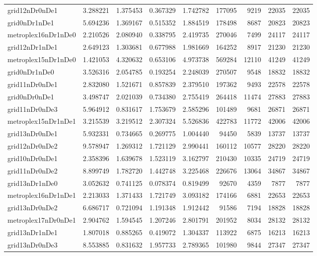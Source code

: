 \begin{longtable}{|l|r|r|r|r|r|r|r|r|}
grid12nDr0nDe1 & 3.288221 & 1.375453 & 0.367329 & 1.742782 & 177095 & 9219 & 22035 & 22035 \\
grid0nDr1nDe1 & 5.694236 & 1.369167 & 0.515352 & 1.884519 & 178498 & 8687 & 20823 & 20823 \\
metroplex16nDr1nDe0 & 2.210526 & 2.080940 & 0.338795 & 2.419735 & 270046 & 7499 & 24117 & 24117 \\
grid12nDr1nDe1 & 2.649123 & 1.303681 & 0.677988 & 1.981669 & 164252 & 8917 & 21230 & 21230 \\
metroplex15nDr1nDe0 & 1.421053 & 4.320632 & 0.653106 & 4.973738 & 569284 & 12110 & 41249 & 41249 \\
grid0nDr1nDe0 & 3.526316 & 2.054785 & 0.193254 & 2.248039 & 270507 & 9548 & 18832 & 18832 \\
grid11nDr0nDe1 & 2.832080 & 1.521671 & 0.857839 & 2.379510 & 197362 & 9493 & 22578 & 22578 \\
grid0nDr0nDe1 & 3.498747 & 2.021039 & 0.734380 & 2.755419 & 264418 & 11474 & 27883 & 27883 \\
grid11nDr0nDe3 & 5.964912 & 0.831617 & 1.753679 & 2.585296 & 101489 & 9681 & 26871 & 26871 \\
metroplex15nDr1nDe1 & 3.215539 & 3.219512 & 2.307324 & 5.526836 & 422783 & 11772 & 42006 & 42006 \\
grid13nDr0nDe1 & 5.932331 & 0.734665 & 0.269775 & 1.004440 & 94450 & 5839 & 13737 & 13737 \\
grid12nDr0nDe2 & 9.578947 & 1.269312 & 1.721129 & 2.990441 & 160112 & 10577 & 28220 & 28220 \\
grid10nDr0nDe1 & 2.358396 & 1.639678 & 1.523119 & 3.162797 & 210430 & 10335 & 24719 & 24719 \\
grid11nDr0nDe2 & 8.899749 & 1.782720 & 1.442748 & 3.225468 & 226676 & 13064 & 34867 & 34867 \\
grid13nDr1nDe0 & 3.052632 & 0.741125 & 0.078374 & 0.819499 & 92670 & 4359 & 7877 & 7877 \\
metroplex16nDr1nDe1 & 2.213033 & 1.371433 & 1.721749 & 3.093182 & 174166 & 6881 & 22653 & 22653 \\
grid13nDr0nDe2 & 6.686717 & 0.721094 & 1.191348 & 1.912442 & 91586 & 7194 & 18828 & 18828 \\
metroplex17nDr0nDe1 & 2.904762 & 1.594545 & 1.207246 & 2.801791 & 201952 & 8034 & 28132 & 28132 \\
grid13nDr1nDe1 & 1.807018 & 0.885265 & 0.419072 & 1.304337 & 113922 & 6875 & 16213 & 16213 \\
grid13nDr0nDe3 & 8.553885 & 0.831632 & 1.957733 & 2.789365 & 101980 & 9844 & 27347 & 27347 \\

\end{longtable}
